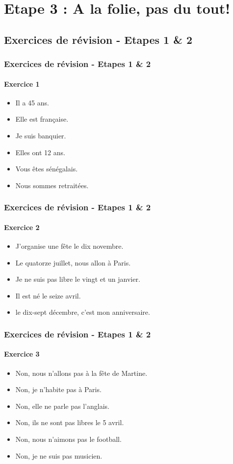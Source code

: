 \documentclass{beamer}
\begin{document}
\section{Etape 3 : A la folie, pas du tout!}

\subsection{Exercices de révision - Etapes 1 \& 2}

\frame
{
  \frametitle{Exercices de révision - Etapes 1 \& 2}

  \framesubtitle{Exercice 1}
  
  \begin{itemize}
    \item Il a 45 ans.
    \item Elle est française.
    \item Je suis banquier.
    \item Elles ont 12 ans.
    \item Vous êtes sénégalais.
    \item Nous sommes retraitées.
  \end{itemize}
}

\frame
{
  \frametitle{Exercices de révision - Etapes 1 \& 2}

  \framesubtitle{Exercice 2}
  
  \begin{itemize}
    \item J'organise une fête le dix novembre.
    \item Le quatorze juillet, nous allon à Paris.
    \item Je ne suis pas libre le vingt et un janvier.
    \item Il est né le seize avril.
    \item le dix-sept décembre, c'est mon anniversaire.
  \end{itemize}
}

\frame
{
  \frametitle{Exercices de révision - Etapes 1 \& 2}

  \framesubtitle{Exercice 3}
  
  \begin{itemize}
    \item Non, nous n'allons pas à la fête de Martine.
    \item Non, je n'habite pas à Paris.
    \item Non, elle ne parle pas l'anglais.
    \item Non, ils ne sont pas libres le 5 avril.
    \item Non, nous n'aimons pas le football.
    \item Non, je ne suis pas musicien.
  \end{itemize}
}
\end{document}
